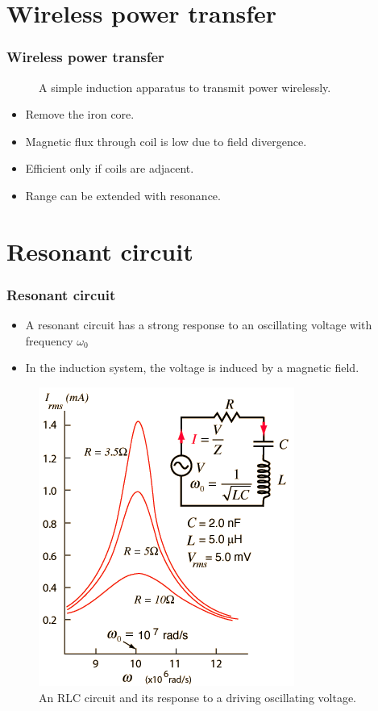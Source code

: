 \documentclass{beamer}
\begin{document}
\section{Wireless power transfer}
\begin{frame}
  \frametitle{Wireless power transfer}
  \begin{figure}
    
    \caption{A simple induction apparatus to transmit power wirelessly.}
  \end{figure}
  \begin{itemize}
    \item Remove the iron core.
    \item Magnetic flux through coil is low due to field divergence.
    \item Efficient only if coils are adjacent.
    \item Range can be extended with resonance.
  \end{itemize}
\end{frame}


\section{Resonant circuit}
\begin{frame}
  \frametitle{Resonant circuit}
  \begin{itemize}
    \item A resonant circuit has a strong response to an oscillating voltage
      with frequency $\omega_0$
    \item In the induction system, the voltage is induced by a magnetic field.
  \end{itemize}
  \begin{figure}
  \includegraphics[scale=0.3]{images/RLC.png}
  \caption{An RLC circuit
    and its response to a driving oscillating voltage.
    \textcite{hyperphysicsresonate}}
  \end{figure}
\end{frame}
\end{document}
